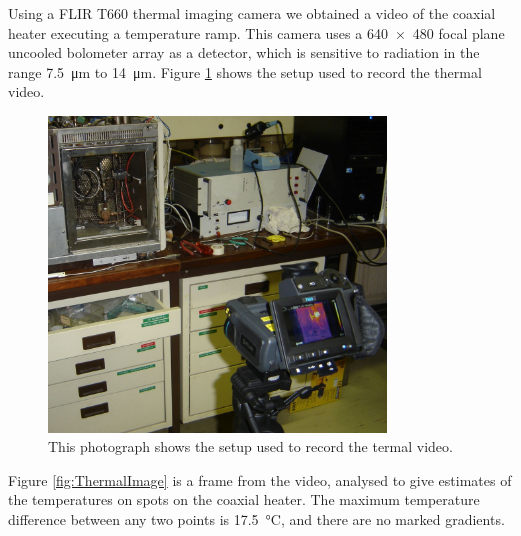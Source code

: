 Using a FLIR{\texttrademark} T660 thermal imaging camera we obtained a video of
the coaxial heater executing a temperature ramp. This camera uses a \num{640 x 480}
focal plane uncooled bolometer array as a detector, which is sensitive to
radiation in the range \SI{7.5}{\micro\metre} to \SI{14}{\micro\metre}.
Figure \ref{fig:ThermalImageSetup} shows the setup used to record the thermal
video.

\begin{figure}
	\centering
	\includegraphics[width=0.8\textwidth]{Figures/ThermalImageSetup}
	\decoRule
	
\caption[A photograph of the setup used to record the thermal video]{This
photograph shows the setup used to record the termal video.}
	
	\label{fig:ThermalImageSetup}
\end{figure}

Figure \ref{fig:ThermalImage} is a frame from the video, analysed to give
estimates of the temperatures on spots on the coaxial heater. The maximum
temperature difference between any two points is \SI{17.5}{\celsius}, and there
are no marked gradients.

